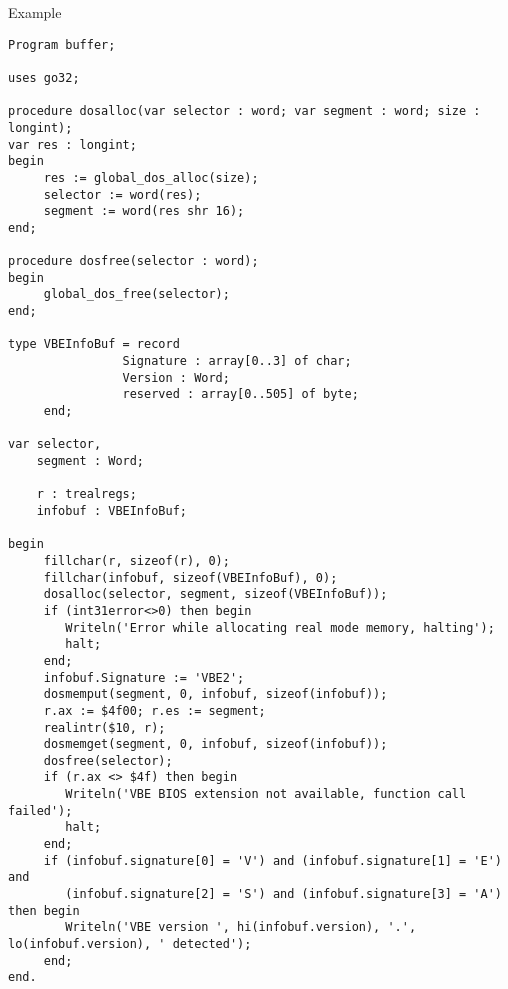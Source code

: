 \begin{FPCList}
\item[Example]
\begin{verbatim}
Program buffer;

uses go32;

procedure dosalloc(var selector : word; var segment : word; size : longint);
var res : longint;
begin
     res := global_dos_alloc(size);
     selector := word(res);
     segment := word(res shr 16);
end;

procedure dosfree(selector : word);
begin
     global_dos_free(selector);
end;

type VBEInfoBuf = record
                Signature : array[0..3] of char; 
                Version : Word;
                reserved : array[0..505] of byte; 
     end;

var selector,       
    segment : Word; 

    r : trealregs;  
    infobuf : VBEInfoBuf;

begin
     fillchar(r, sizeof(r), 0);
     fillchar(infobuf, sizeof(VBEInfoBuf), 0);
     dosalloc(selector, segment, sizeof(VBEInfoBuf));
     if (int31error<>0) then begin
        Writeln('Error while allocating real mode memory, halting');
        halt;
     end;
     infobuf.Signature := 'VBE2';
     dosmemput(segment, 0, infobuf, sizeof(infobuf));
     r.ax := $4f00; r.es := segment;
     realintr($10, r);
     dosmemget(segment, 0, infobuf, sizeof(infobuf));
     dosfree(selector);
     if (r.ax <> $4f) then begin
        Writeln('VBE BIOS extension not available, function call failed');
        halt;
     end;
     if (infobuf.signature[0] = 'V') and (infobuf.signature[1] = 'E') and
        (infobuf.signature[2] = 'S') and (infobuf.signature[3] = 'A') then begin
        Writeln('VBE version ', hi(infobuf.version), '.', lo(infobuf.version), ' detected');
     end;
end.\end{verbatim}
\end{FPCList}